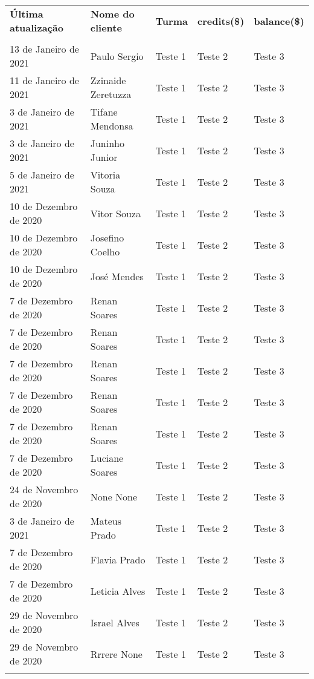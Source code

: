 \documentclass{article}%
\begin{document}
\begin{longtabu}{X[1.5l] X[2l] X[r] X[r] X[r]}%
%
\textbf{Última atualização}&\textbf{Nome do cliente}&\textbf{Turma}&\textbf{credits(\$)}&\textbf{balance(\$)}\\%
&&&&\\%
\hline%
%
13 de Janeiro de 2021&Paulo Sergio&Teste 1&Teste 2&Teste 3\\%
11 de Janeiro de 2021&Zzinaide Zeretuzza&Teste 1&Teste 2&Teste 3\\%
%
3 de Janeiro de 2021&Tifane Mendonsa&Teste 1&Teste 2&Teste 3\\%
3 de Janeiro de 2021&Juninho Junior&Teste 1&Teste 2&Teste 3\\%
%
5 de Janeiro de 2021&Vitoria Souza&Teste 1&Teste 2&Teste 3\\%
10 de Dezembro de 2020&Vitor Souza&Teste 1&Teste 2&Teste 3\\%
%
10 de Dezembro de 2020&Josefino Coelho&Teste 1&Teste 2&Teste 3\\%
10 de Dezembro de 2020&José Mendes&Teste 1&Teste 2&Teste 3\\%
%
7 de Dezembro de 2020&Renan Soares&Teste 1&Teste 2&Teste 3\\%
7 de Dezembro de 2020&Renan Soares&Teste 1&Teste 2&Teste 3\\%
%
7 de Dezembro de 2020&Renan Soares&Teste 1&Teste 2&Teste 3\\%
7 de Dezembro de 2020&Renan Soares&Teste 1&Teste 2&Teste 3\\%
%
7 de Dezembro de 2020&Renan Soares&Teste 1&Teste 2&Teste 3\\%
7 de Dezembro de 2020&Luciane Soares&Teste 1&Teste 2&Teste 3\\%
%
24 de Novembro de 2020&None None&Teste 1&Teste 2&Teste 3\\%
3 de Janeiro de 2021&Mateus Prado&Teste 1&Teste 2&Teste 3\\%
%
7 de Dezembro de 2020&Flavia Prado&Teste 1&Teste 2&Teste 3\\%
7 de Dezembro de 2020&Leticia Alves&Teste 1&Teste 2&Teste 3\\%
%
29 de Novembro de 2020&Israel Alves&Teste 1&Teste 2&Teste 3\\%
29 de Novembro de 2020&Rrrere None&Teste 1&Teste 2&Teste 3\\%
%

\end{longtabu}
\end{document}
